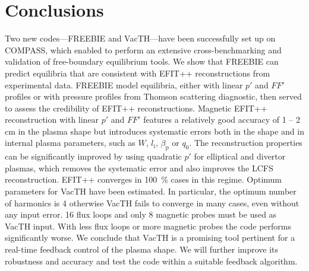 
\section{Conclusions} %
\label{sec:conclusions}

Two new codes---FREEBIE and VacTH---have been successfully set up on COMPASS, which enabled to perform an extensive cross-benchmarking and validation of free-boundary equilibrium tools. We show that FREEBIE can predict equilibria that are consistent with EFIT++ reconstructions from experimental data. FREEBIE model equilibria, either with linear $p'$ and $FF'$ profiles or with pressure profiles from Thomson scattering diagnostic, then served to assess the credibility of EFIT++ reconstructions. 
Magnetic EFIT++ reconstruction with linear $p'$ and $FF'$ features a relatively good accuracy of 1 -- 2 cm in the plasma shape but introduces systematic errors both in the shape and in internal plasma parameters, such as $W$, $l_{\mathrm i}$, $\beta_{\mathrm p}$ or $q_0$. The reconstruction properties can be significantly improved by using quadratic $p'$ for elliptical and divertor plasmas, which removes the systematic error and also improves the LCFS reconstruction. EFIT++ converges in 100~\% cases in this regime.
Optimum parameters for VacTH have been estimated. In particular, the optimum number of harmonics is 4 otherwise VacTH fails to converge in many cases, even without any input error. 16 flux loops and only 8 magnetic probes must be used as VacTH input. With less flux loops or more magnetic probes the code performs significantly worse. We conclude that VacTH is a promising tool pertinent for a real-time feedback control of the plasma shape. We will further improve its robustness and accuracy and test the code within a suitable feedback algorithm.

